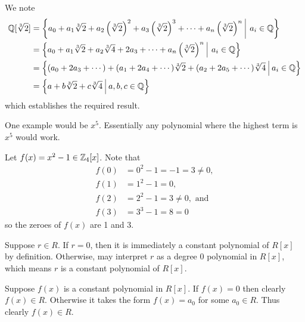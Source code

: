 \begin{questions}
    \item We note
    \begin{align*}
        \Q[\sqrt[3]{2}] &= \left\{a_0 + a_1\sqrt[3]{2} + a_2\left(\sqrt[3]{2}\right)^2 + a_3\left(\sqrt[3]{2}\right)^3 + \cdots + a_n\left(\sqrt[3]{2}\right)^n \vert a_i \in \Q\right\}\\
        &= \left\{a_0 + a_1\sqrt[3]{2} + a_2\sqrt[3]{4} + 2a_3 + \cdots + a_n\left(\sqrt[3]{2}\right)^n \vert a_i \in \Q\right\}\\
        &= \left\{(a_0 + 2a_3 + \cdots) + (a_1 + 2a_4 + \cdots)\sqrt[3]{2} + (a_2 + 2a_5 + \cdots)\sqrt[3]{4} \vert a_i \in \Q\right\}\\
        &= \left\{a + b\sqrt[3]{2} + c\sqrt[3]{4} \vert a,b,c \in \Q\right\}
    \end{align*}
    which establishes the required result.

    \item One example would be $x^5$. Essentially any polynomial where the highest term is $x^5$ would work.
    
    \item Let $f(x) = x^2 - 1 \in \mathbb{Z}_4[x]$. Note that
    \begin{align*}
        f(0) &= 0^2 - 1 = -1 = 3 \neq 0,\\
        f(1) &= 1^2 - 1 = 0,\\
        f(2) &= 2^2 - 1 = 3 \neq 0, \text{ and}\\
        f(3) &= 3^3 - 1 = 8 = 0
    \end{align*}
    so the zeroes of $f(x)$ are 1 and 3.

    \item \begin{partquestions}{\alph*}
        \item Suppose $r \in R$. If $r = 0$, then it is immediately a constant polynomial of $R[x]$ by definition. Otherwise, may interpret $r$ as a degree 0 polynomial in $R[x]$, which means $r$ is a constant polynomial of $R[x]$.

        \item Suppose $f(x)$ is a constant polynomial in $R[x]$. If $f(x) = 0$ then clearly $f(x) \in R$. Otherwise it takes the form $f(x) = a_0$ for some $a_0 \in R$. Thus clearly $f(x) \in R$.
    \end{partquestions}
    

\end{questions}

